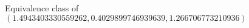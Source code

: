 \documentclass[preview]{standalone}
\begin{document}
\begin{center}
Equivalence class of $(1.4943403330559262, 0.4029899746939639, 1.266706773210936)$
\end{center}
\end{document}
